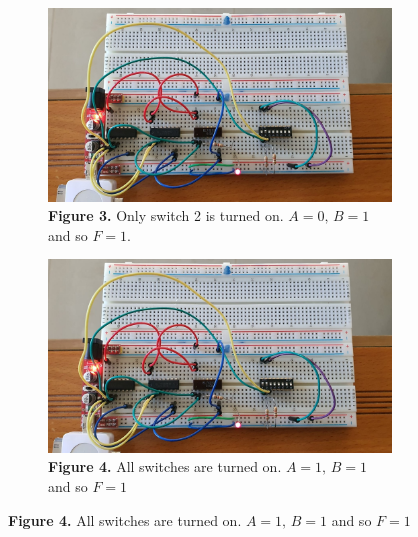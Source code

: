 \documentclass[a4paper]{article}
\begin{document}
\newpage
\begin{figure}
     \centering
     \begin{subfigure}[b]{0.9\textwidth}
         \centering
         \includegraphics[angle=90, width=\textwidth]{2onn.jpeg}
         \caption*{\textbf{Figure 3.} Only switch 2 is turned on.  $A=0,\, B=1$ and so $F=1$.\vspace{2em}}
         \label{fig:2on}
     \end{subfigure}
     \hfill
     \begin{subfigure}[b]{0.9\textwidth}
         \centering
         \includegraphics[angle=90, width=\textwidth]{12onn.jpeg}
         \caption*{\textbf{Figure 4.} All switches are turned on. $A=1,\, B=1$ and so $F=1$}
         \label{fig:1on}
     \end{subfigure}
   \end{figure}
\end{document}

